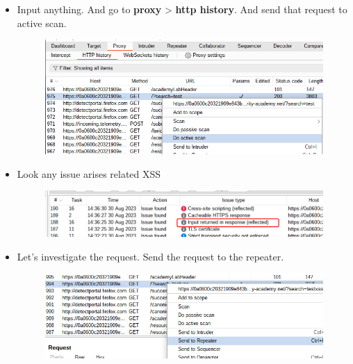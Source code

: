 \documentclass[
	a4paper, %
	12pt, %
]{CSSullivanBusinessReport}
\begin{document}
\begin{fullwidth}
\begin{figure}[H]
    
\end{figure}
\begin{itemize}
    \item Input anything. And go to {\color{orange}\textbf{proxy}} > {\color{orange}\textbf{http history}}. And send that request to active scan.
    \begin{figure}[H]
        \centering
        \includegraphics[width=1\linewidth]{Images//Reflected XSS/send_to_scan.png}        
    \end{figure}

    \item Look any issue arises related XSS
    \begin{figure}[H]
        \centering
        \includegraphics[width=1\linewidth]{Images//Reflected XSS/issues.png}
        
        
    \end{figure}
    \item Let's investigate the request. Send the request to the repeater.
\begin{figure}[H]
    \centering
    \includegraphics[width=1\linewidth]{Images//Reflected XSS/send_to_repeater.png}
    

\end{figure}
\end{itemize}
\end{fullwidth}
\end{document}
